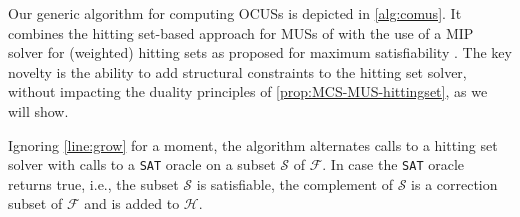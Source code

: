 \documentclass[twoside,11pt]{article}
\newcommand\m[1]{\mathcal{#1}}
\newcommand\setstohit{\ensuremath{\m{H} }\xspace}
\newcommand\Iend{\ensuremath{I_\mathit{end} }\xspace}
\newcommand\formula{\ensuremath{\m{F} }\xspace}
\newcommand\formulag{\ensuremath{\m{G} }\xspace}
\newcommand\mm[1]{\ensuremath{#1}\xspace}
\newcommand\call[1]{\mm{\textsc{#1}}}
\newcommand\sat{\texttt{{SAT}}\xspace}
\newcommand\grow{\mm{\call{Grow}}}
\newcommand\comus{\mm{\call{OCUS}}}
\begin{document}
%
Our generic algorithm for computing OCUSs is depicted in \cref{alg:comus}. It combines the hitting set-based approach for MUSs of \cite{ignatiev2015smallest} with the use of a MIP solver for (weighted) hitting sets as proposed for maximum satisfiability \cite{DBLP:conf/sat/DaviesB13}. The key novelty is the ability to add structural constraints to the hitting set solver, without impacting the duality principles of \cref{prop:MCS-MUS-hittingset}, as we will show.

Ignoring \cref{line:grow} for a moment, 
the algorithm alternates calls to a hitting set solver with calls to a \sat oracle on a subset $\m{S}$ of $\formula$. 
In case the \sat oracle returns true, i.e., the subset $\m{S}$ is satisfiable, the complement of $\m{S}$ is a correction subset of $\m{F}$ and is added to \setstohit. %
\end{document}
